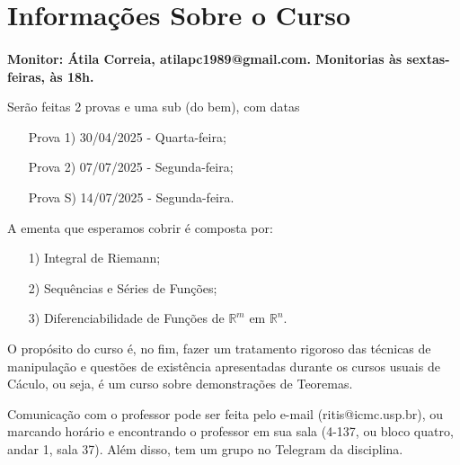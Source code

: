 \documentclass[12pt]{article}
\theoremstyle{definition}
\begin{document}
\tableofcontents

\newpage

\section{Informações Sobre o Curso}
\paragraph{}\textbf{Monitor: Átila Correia, atilapc1989@gmail.com. Monitorias às sextas-feiras, às 18h.}

Serão feitas 2 provas e uma sub (do bem), com datas
\begin{itemize}
	\item[Prova 1)] 30/04/2025 - Quarta-feira;
	\item[Prova 2)] 07/07/2025 - Segunda-feira;
	\item[Prova S)] 14/07/2025 - Segunda-feira.
\end{itemize}

A ementa que esperamos cobrir é composta por:
\begin{itemize}
	\item[1)] Integral de Riemann;
	\item[2)] Sequências e Séries de Funções;
	\item[3)] Diferenciabilidade de Funções de \(\mathbb{R}^{m}\) em \(\mathbb{R}^{n}\).
\end{itemize}

O propósito do curso é, no fim, fazer um tratamento rigoroso das técnicas de manipulação e questões de existência apresentadas durante os cursos usuais de Cáculo, ou seja, é um curso sobre demonstrações de Teoremas.

Comunicação com o professor pode ser feita pelo e-mail (ritis@icmc.usp.br), ou marcando horário e encontrando o professor em sua sala (4-137, ou bloco quatro, andar 1, sala 37). Além disso, tem um grupo no Telegram da disciplina.


\newpage

\newpage

\newpage

\newpage

\newpage

\newpage

\newpage

\newpage

\newpage

\newpage

\newpage

\newpage

\newpage

\newpage

\newpage

\newpage

\newpage

\newpage

\newpage

\newpage

\newpage

\newpage

\newpage

\newpage

\newpage

\newpage
\end{document}
